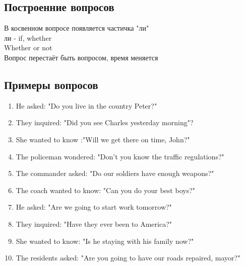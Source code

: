 \subsection{Построенние вопросов}
\p
В косвенном вопросе появляется частичка "ли"\\
ли - if, whether\\
Whether or not\\
Вопрос перестаёт быть вопросом, время меняется

\subsection{Примеры вопросов}
\p
\begin{enumerate}
    \item He asked: "Do you live in the country Peter?"\\
    \item They inquired: "Did you see Charles yesterday morning"?\\
    \item She wanted to know :"Will we get there on time, John?"\\
    \item The policeman wondered: "Don't you know the traffic regulations?"\\
    \item The commander asked: "Do our soldiers have enough weapons?"\\
    \item The coach wanted to know: "Can you do your best boys?"\\
    \item He asked: "Are we going to start work tomorrow?"\\
    \item They inquired: "Have they ever been to America?"\\
    \item She wanted to know: "Is he staying with his family now?"\\
    \item The residents asked: "Are you going to have our roads repaired, mayor?"\\
\end{enumerate}

